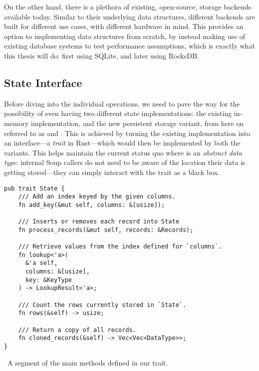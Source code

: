 On the other hand, there is a plethora of existing, open-source, storage
backends available today. Similar to their underlying data structures, different
backends are built for different use cases, with different hardware in mind.
This provides an option to implementing data structures from scratch, by instead
making use of existing database systems to test performance assumptions, which
is exactly what this thesis will do: first using SQLite, and later using
RocksDB.\@

\subsection{State Interface}\label{sec:trait}
Before diving into the individual  operations, we need to pave the
way for the possibility of even having two different state implementations: the
existing in-memory implementation, and the new persistent storage variant, from
here on referred to as  and . This is
achieved by turning the existing  implementation into an
interface---a \textit{trait} in Rust---which would then be implemented by both
the  variants. This helps maintain the current status quo where
 is an \textit{abstract data type}: internal Soup callers do not
need to be aware of the location their data is getting stored---they can simply
interact with the  trait as a black box\@.

\begin{listing}[H]
  \begin{verbatim}
pub trait State {
    /// Add an index keyed by the given columns.
    fn add_key(&mut self, columns: &[usize]);

    /// Inserts or removes each record into State
    fn process_records(&mut self, records: &Records);

    /// Retrieve values from the index defined for `columns`.
    fn lookup<'a>(
      &'a self,
      columns: &[usize],
      key: &KeyType
    ) -> LookupResult<'a>;

    /// Count the rows currently stored in `State`.
    fn rows(&self) -> usize;

    /// Return a copy of all records.
    fn cloned_records(&self) -> Vec<Vec<DataType>>;
}
  \end{verbatim}

  \caption{\
    A segment of the main methods defined in our  trait.
  }\label{lst:state}
\end{listing}

